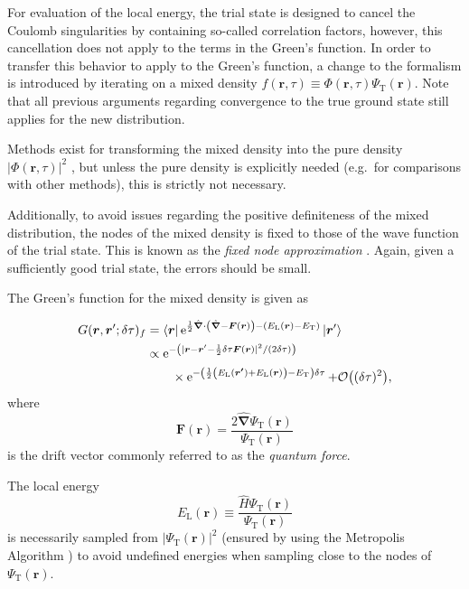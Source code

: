 For evaluation of the local energy, the trial state is designed to cancel the Coulomb singularities by containing so-called correlation factors, however, this cancellation does not apply to the terms in the Green's function. In order to transfer this behavior to apply to the Green's function, a change to the formalism is introduced by iterating on a mixed density $f(\bm{r}, \tau) \equiv \Phi(\bm{r}, \tau)\Psi_{\mathrm{T}}(\bm{r})$. Note that all previous arguments regarding convergence to the true ground state still applies for the new distribution.

Methods exist for transforming the mixed density into the pure density $|\Phi(\bm{r}, \tau)|^2$ \cite{abInitioMC}, but unless the pure density is explicitly needed (e.g.~for comparisons with other methods), this is strictly not necessary.

Additionally, to avoid issues regarding the positive definiteness of the mixed distribution, the nodes of the mixed density is fixed to those of the wave function of the trial state. This is known as the \textit{fixed node approximation} \cite{umrigar:2865, abInitioMC}. Again, given a sufficiently good trial state, the errors should be small.

The Green's function for the mixed density is given as \cite{umrigar:2865}

\begin{align}
  G(\bm{r}, \bm{r}'; \delta\tau)_f &= \langle \bm{r} | \operatorname{e}^{\frac{1}{2} \hat{\bm{\nabla}} \cdot \left(\hat{\bm{\nabla}} - \bm{F}(\bm{r})\right) - \left(E_{\mathrm{L}}(\bm{r}) - E_{\mathrm{T}}\right)} | \bm{r}' \rangle \label{eq:DMC_IS_GF_raw}\\
  &\propto \operatorname{e}^{-\left(|\bm{r} - \bm{r}' - \frac{1}{2}\delta\tau\bm{F}(\bm{r})|^2/(2\delta\tau)\right)} \label{eq:DMC_IS_GF}\\
  &\qquad\times \operatorname{e}^{-\left(\frac{1}{2}\left(E_{\mathrm{L}}(\bm{r'}) + E_{\mathrm{L}}(\bm{r})\right) - E_{\mathrm{T}}\right) \delta\tau} + \mathcal{O}\bigl((\delta\tau)^2\bigr), \notag
\end{align}
where
\begin{equation}
  \bm{F}(\bm{r}) = \frac{2 \hat{\bm{\nabla}} \Psi_{\mathrm{T}}(\bm{r})}{\Psi_{\mathrm{T}}(\bm{r})}
\end{equation}
is the drift vector commonly referred to as the \textit{quantum force}.

The local energy
\begin{equation}
E_{\mathrm{L}}(\bm{r}) \equiv \frac{\hat{H} \Psi_{\mathrm{T}}(\bm{r})}{\Psi_{\mathrm{T}}(\bm{r})}
\end{equation}
is necessarily sampled from $|\Psi_{\mathrm{T}}(\bm{r})|^2$ (ensured by using the Metropolis Algorithm \cite{abInitioMC}) to avoid undefined energies when sampling close to the nodes of $\Psi_{\mathrm{T}}(\bm{r})$.

